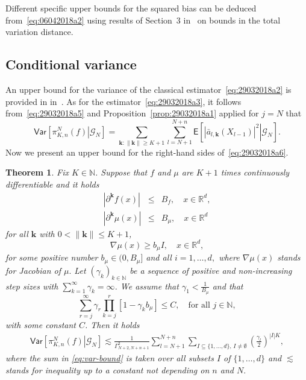 \documentclass[aap,preprint]{imsart}
\newtheorem{thm}{Theorem}
\begin{document}
Different specific upper bounds for the squared bias
can be deduced from~\eqref{eq:06042018a2}
using results of Section~3 in~\cite{durmus:moulines:2017}
on bounds in the total variation distance.






\subsection{Conditional variance}
An upper bound for the variance of the classical estimator~\eqref{eq:29032018a2}
is provided in  in~\cite[Theorem~17]{durmus:moulines:2017}.
As for the estimator~\eqref{eq:29032018a3},
it follows from~\eqref{eq:29032018a5}
and Proposition~\ref{prop:29032018a1}
applied for $j=N$ that
\begin{equation}\label{eq:29032018a6}
\mathsf{Var}\left[\left.\pi_{K,n}^{N}(f)\right|\mathcal G_N\right]
=\sum_{\mathbf k\colon \|\mathbf k\|\ge K+1}
\sum_{l=N+1}^{N+n}
\mathsf{E}\left[\left.\left|\bar a_{l,\mathbf{k}}(X_{l-1})\right|^{2}
\right|\mathcal G_N\right].
\end{equation}
Now we present an upper bound for the right-hand sides of~\eqref{eq:29032018a6}.
\begin{thm}\label{th:mr}
Fix $K\in\mathbb N$.
Suppose that $f$  and \(\mu\) are \(K+1\) times continuously differentiable
and it holds
\begin{eqnarray*}
|\partial^{\mathbf{k}} f(x)|&\le & B_f,\quad
x\in\mathbb R^d,
\\
|\partial^{\mathbf{k}}\mu(x)|&\le & B_\mu,\quad
x\in\mathbb R^d
\end{eqnarray*}
for all \(\mathbf{k}\) with \(0<\|\mathbf{k}\|\leq  K+1\),
\[
\nabla\mu(x)\ge b_\mu I ,\quad x\in\mathbb R^d,
\]
for some positive number $b_\mu\in(0,B_\mu]$ and all \(i=1,\ldots, d,\) where  \(\nabla\mu(x)\) stands for Jacobian of \(\mu.\)
Let $(\gamma_k)_{k\in\mathbb N}$ be a sequence of positive
and non-increasing step sizes with $\sum_{k=1}^\infty \gamma_k=\infty$.
We  assume that $\gamma_1<\frac1{B_\mu}$ and that
\begin{equation}\label{eq:17042018a1}
\sum_{r=j}^\infty \gamma_r\prod_{k=j}^{r}\left[1-\gamma_{k}b_\mu\right]\leq C,\quad\text{for all }j\in\mathbb N,
\end{equation}
with some constant \(C\). Then it holds
\begin{eqnarray}
\label{eq:var-bound}
\mathsf{Var}\left[\left.\pi_{K,n}^{N}(f)\right|\mathcal G_N\right]\lesssim \frac{1}{\Gamma^2_{N+2,N+n+1}}\sum_{l=N+1}^{N+n}\sum_{I\subseteq\{1,\ldots,d\},\, I\neq \emptyset}
\left(\frac{\gamma_{l}}{2}\right)^{|I|K},
\end{eqnarray}
where the sum in \eqref{eq:var-bound} is taken over all subsets \(I\) of \(\{1,\ldots,d\}\) and \(\lesssim\) stands for inequality up to a constant not depending  on \(n\) and \(N.\)
\end{thm}
\end{document}
